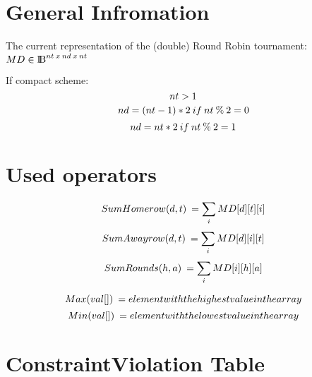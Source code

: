 \documentclass[•]{article}
\begin{document}
\section{General Infromation}
The current representation of the (double) Round Robin tournament: ${MD \in \rm I\!B}^{nt\: x\: nd\: x\: nt}$

If compact scheme:
\[\large nt > 1 \]
\[\large nd = (nt-1) * 2\: if\: nt \:\% \:2 = 0\]
\[\large nd = nt * 2\: if\: nt \:\% \:2 = 1\]

\section{Used operators}
\[\large SumHomerow(d,t)\:= \sum_i MD[d][t][i]\]
\[\large SumAwayrow(d,t)\:= \sum_i MD[d][i][t]\]
\[\large SumRounds(h,a)\:= \sum_i MD[i][h][a]\]

\[\large Max(val[])\:= element with the highest value in the array\]
\[\large Min(val[])\:= element with the lowest value in the array\]


\section{ConstraintViolation Table}
\noindent%
\end{document}
